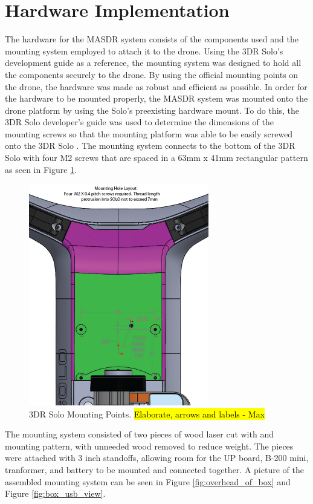 \section{Hardware Implementation}\label{Mounting}
The hardware for the MASDR system consists of the components used and the mounting system employed to attach it to the drone. Using the 3DR Solo’s development guide as a reference, the mounting system was designed to hold all the components securely to the drone. By using the official mounting points on the drone, the hardware was made as robust and efficient as possible.
In order for the hardware to be mounted properly, the MASDR system was mounted onto the drone platform by using the Solo’s preexisting hardware mount. To do this, the 3DR Solo developer's guide was used to determine the dimensions of the mounting screws so that the mounting platform was able to be easily screwed onto the 3DR Solo \cite{3dr_devguide}. The mounting system connects to the bottom of the 3DR Solo with four M2 screws that are spaced in a 63mm x 41mm rectangular pattern as seen in Figure \ref{fig:solo_mount}.
\begin{figure}[ht]
\centering
\includegraphics[width=0.70\textwidth]{img/solo_mount_points.png}
\caption{3DR Solo Mounting Points. \hl{Elaborate, arrows and labels - Max}}
\label{fig:solo_mount}
\end{figure} \par
The mounting system consisted of two pieces of wood laser cut with and mounting pattern, with unneeded wood removed to reduce weight. The pieces were attached with 3 inch standoffs, allowing room for the UP board, B-200 mini, tranformer, and battery to be mounted and connected together. A picture of the assembled mounting system can be seen in Figure \ref{fig:overhead_of_box} and Figure \ref{fig:box_usb_view}. \par

